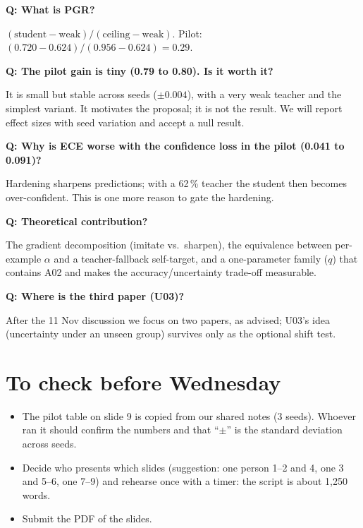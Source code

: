 \documentclass[10pt,a4paper]{article}
\newcommand{\Q}[1]{\par\medskip\noindent\textbf{Q: #1}\par\noindent}
\begin{document}
\Q{What is PGR?} $(\text{student}-\text{weak})/(\text{ceiling}-\text{weak})$. Pilot: $(0.720-0.624)/(0.956-0.624)=0.29$.

\Q{The pilot gain is tiny (0.79 to 0.80). Is it worth it?} It is small but stable across seeds ($\pm0.004$),
with a very weak teacher and the simplest variant. It motivates the proposal; it is not the result. We will
report effect sizes with seed variation and accept a null result.

\Q{Why is ECE worse with the confidence loss in the pilot (0.041 to 0.091)?} Hardening sharpens predictions;
with a 62\,\% teacher the student then becomes over-confident. This is one more reason to gate the hardening.

\Q{Theoretical contribution?} The gradient decomposition (imitate vs.\ sharpen), the equivalence between
per-example $\alpha$ and a teacher-fallback self-target, and a one-parameter family ($q$) that contains A02 and
makes the accuracy/uncertainty trade-off measurable.

\Q{Where is the third paper (U03)?} After the 11 Nov discussion we focus on two papers, as advised; U03's idea
(uncertainty under an unseen group) survives only as the optional shift test.

\section{To check before Wednesday}
\begin{itemize}
\item The pilot table on slide 9 is copied from our shared notes (3 seeds). Whoever ran it should confirm the
numbers and that ``$\pm$'' is the standard deviation across seeds.
\item Decide who presents which slides (suggestion: one person 1--2 and 4, one 3 and 5--6, one 7--9) and rehearse
once with a timer: the script is about 1{,}250 words.
\item Submit the PDF of the slides.
\end{itemize}
\end{document}
